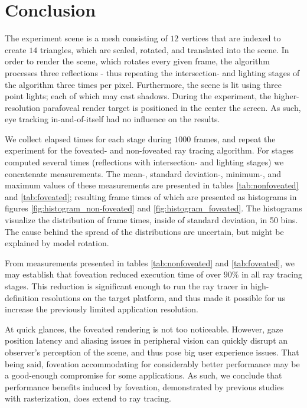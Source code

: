 
\section{Conclusion}
The experiment scene is a mesh consisting of $12$ vertices that are indexed to create $14$ triangles, which are scaled, rotated, and translated into the scene.
In order to render the scene, which rotates every given frame, the algorithm processes three reflections - thus repeating the intersection- and lighting stages of the algorithm three times per pixel.
Furthermore, the scene is lit using three point lights; each of which may cast shadows.
During the experiment, the higher-resolution parafoveal render target is positioned in the center the screen.
As such, eye tracking in-and-of-itself had no influence on the results.

We collect elapsed times for each stage during $1000$ frames, and repeat the experiment for the foveated- and non-foveated ray tracing algorithm.
For stages computed several times (reflections with intersection- and lighting stages) we concatenate measurements.
The mean-, standard deviation-, minimum-, and maximum values of these measurements are presented in tables \ref{tab:nonfoveated} and \ref{tab:foveated}; resulting frame times of which are presented as histograms in figures \ref{fig:histogram_non-foveated} and \ref{fig:histogram_foveated}.
The histograms visualize the distribution of frame times, inside of standard deviation, in 50 bins.
The cause behind the spread of the distributions are uncertain, but might be explained by model rotation.

From measurements presented in tables \ref{tab:nonfoveated} and \ref{tab:foveated}, we may establish that foveation reduced execution time of over $90\%$ in all ray tracing stages.
This reduction is significant enough to run the ray tracer in high-definition resolutions on the target platform, and thus made it possible for us increase the previously limited application resolution.

At quick glances, the foveated rendering is not too noticeable.
However, gaze position latency and aliasing issues in peripheral vision can quickly disrupt an observer's perception of the scene, and thus pose big user experience issues.
That being said, foveation accommodating for considerably better performance may be a good-enough compromise for some applications.
As such, we conclude that performance benefits induced by foveation, demonstrated by previous studies~\cite{guenter12} with rasterization, does extend to ray tracing.

